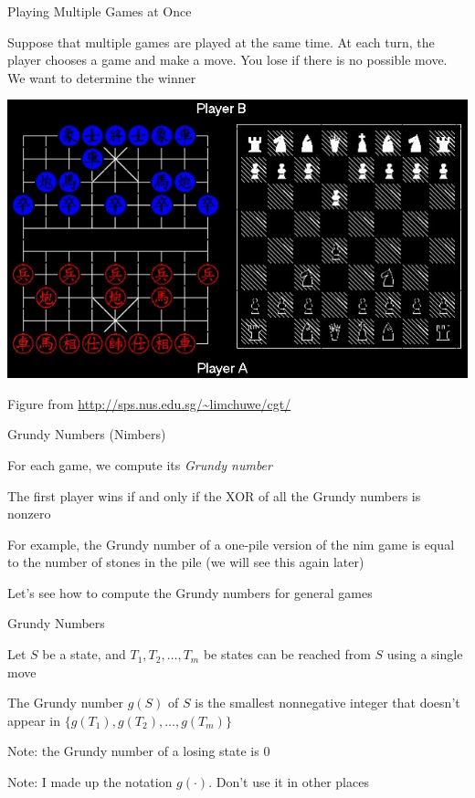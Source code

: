 \documentclass[13pt,onlymath]{beamer}
\begin{document}
\begin{frame}{Playing Multiple Games at Once}
\BIT
\item Suppose that multiple games are played at the same time. At each turn, the player chooses a game and make a move. You lose if there is no possible move. We want to determine the winner
\EIT
\begin{center}
\includegraphics[height=0.5\textheight]{figures/games}

Figure from \url{http://sps.nus.edu.sg/~limchuwe/cgt/}
\end{center}
\end{frame}

\begin{frame}{Grundy Numbers (Nimbers)}
\BIT
\item For each game, we compute its \emph{Grundy number}
\item The first player wins if and only if the XOR of all the Grundy numbers is nonzero
\BIT
\item For example, the Grundy number of a one-pile version of the nim game is equal to the number of stones in the pile (we will see this again later)
\EIT
\vfill
\item Let's see how to compute the Grundy numbers for general games
\EIT
\end{frame}

\begin{frame}{Grundy Numbers}
\BIT
\item Let $S$ be a state, and $T_1, T_2, \ldots, T_m$ be states can be reached from $S$ using a single move
\vfill
\item The Grundy number $g(S)$ of $S$ is the smallest nonnegative integer that doesn't appear in $\{g(T_1), g(T_2), \ldots, g(T_m)\}$
\BIT
\item Note: the Grundy number of a losing state is 0
\item Note: I made up the notation $g(\cdot)$. Don't use it in other places
\EIT
\EIT
\end{frame}
\end{document}
